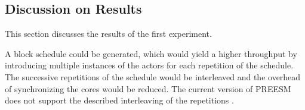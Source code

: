 \subsection{Discussion on Results}
This section discusses the results of the first experiment. 

 A block schedule could be generated, which would yield a higher throughput by introducing multiple instances of the actors for each repetition of the schedule. The successive repetitions of the schedule would be interleaved and the overhead of synchronizing the cores would be reduced. The current version of PREESM does not support the described interleaving of the repetitions \cite{pelcat2014preesm}.


